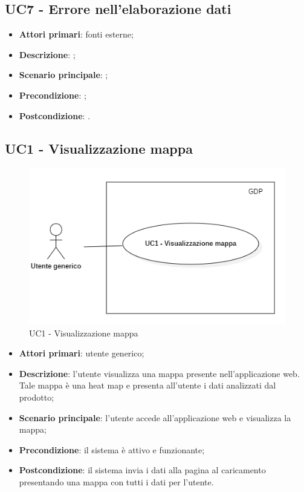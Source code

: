 \subsection{UC7 - Errore nell'elaborazione dati}
\begin{itemize}
	\item \textbf{Attori primari}: fonti esterne;
	\item \textbf{Descrizione}: ;
	\item \textbf{Scenario principale}: ;
	\item \textbf{Precondizione}: ;
	\item \textbf{Postcondizione}: .
\end{itemize}


\subsection{UC1 - Visualizzazione mappa}
\begin{center}
	\begin{figure}[H]
		\includegraphics[width=0.95\linewidth]{../immagini/attori_casi/vis_mappa.png}
		\caption{UC1 - Visualizzazione mappa}
	\end{figure}
\end{center}
\begin{itemize}
	\item \textbf{Attori primari}: utente generico;
	\item \textbf{Descrizione}: l'utente visualizza una mappa presente nell'applicazione web. Tale mappa è una heat map e presenta all'utente i dati analizzati dal prodotto;
	\item \textbf{Scenario principale}: l'utente accede all'applicazione web e visualizza la mappa;
	\item \textbf{Precondizione}: il sistema è attivo e funzionante;
	\item \textbf{Postcondizione}: il sistema invia i dati alla pagina al caricamento presentando una mappa con tutti i dati per l'utente.
\end{itemize}
